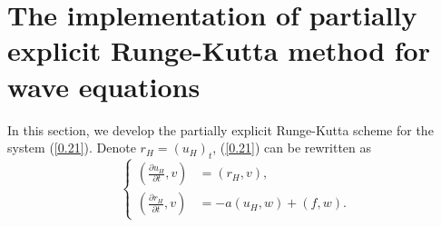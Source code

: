 \documentclass[preprint,12pt]{elsarticle}
\begin{document}
\section{The implementation of partially explicit Runge-Kutta method for wave equations}\label{005}
In this section, we develop the partially explicit Runge-Kutta scheme for the system (\ref{0.21}).
Denote $r_H=(u_H)_t$, (\ref{0.21}) can be rewritten as
\begin{equation}\label{rk1}
\left\{
\begin{aligned}
\left(\frac{\partial u_H}{\partial t},v\right) &= (r_H,v),\\
\left(\frac{\partial r_H}{\partial t} ,v\right)&= -a(u_H,w)+(f,w).
\end{aligned}
\right.
\end{equation}
\end{document}
